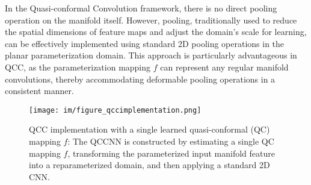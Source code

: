 In the Quasi-conformal Convolution framework, there is no direct pooling operation on the manifold itself. However, pooling, traditionally used to reduce the spatial dimensions of feature maps and adjust the domain's scale for learning, can be effectively implemented using standard 2D pooling operations in the planar parameterization domain. This approach is particularly advantageous in QCC, as the parameterization mapping $f$ can represent any regular manifold convolutions, thereby accommodating deformable pooling operations in a consistent manner.

\begin{figure}
    \centering
    \texttt{[image: im/figure\_qccimplementation.png]}
    \caption{QCC implementation with a single learned quasi-conformal (QC) mapping $f$: The QCCNN is constructed by estimating a single QC mapping $f$, transforming the parameterized input manifold feature into a reparameterized domain, and then applying a standard 2D CNN.}
    \label{fig:qccimplementation}
\end{figure}

